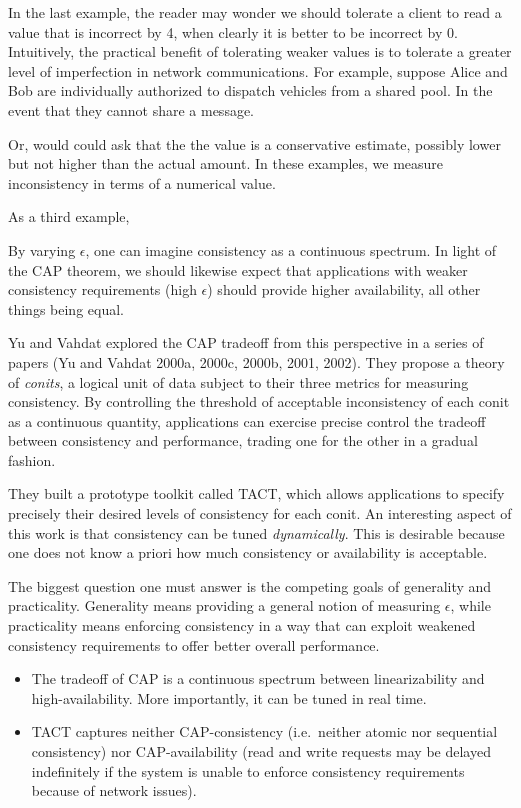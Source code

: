 \documentclass[]             %
{NASA}                       %
\theoremstyle{definition}
\begin{document}
In the last example, the reader may wonder we should tolerate a client
to read a value that is incorrect by 4, when clearly it is better to be
incorrect by 0. Intuitively, the practical benefit of tolerating weaker
values is to tolerate a greater level of imperfection in network
communications. For example, suppose Alice and Bob are individually
authorized to dispatch vehicles from a shared pool. In the event that
they cannot share a message.

Or, would could ask that the the value is a conservative estimate,
possibly lower but not higher than the actual amount. In these examples,
we measure inconsistency in terms of a numerical value.

As a third example,

By varying \(\epsilon\), one can imagine consistency as a continuous
spectrum. In light of the CAP theorem, we should likewise expect that
applications with weaker consistency requirements (high \(\epsilon\))
should provide higher availability, all other things being equal.

Yu and Vahdat explored the CAP tradeoff from this perspective in a
series of papers (Yu and Vahdat 2000a, 2000c, 2000b, 2001, 2002). They
propose a theory of \emph{conits}, a logical unit of data subject to
their three metrics for measuring consistency. By controlling the
threshold of acceptable inconsistency of each conit as a continuous
quantity, applications can exercise precise control the tradeoff between
consistency and performance, trading one for the other in a gradual
fashion.

They built a prototype toolkit called TACT, which allows applications to
specify precisely their desired levels of consistency for each conit. An
interesting aspect of this work is that consistency can be tuned
\emph{dynamically}. This is desirable because one does not know a priori
how much consistency or availability is acceptable.

The biggest question one must answer is the competing goals of
generality and practicality. Generality means providing a general notion
of measuring \(\epsilon\), while practicality means enforcing
consistency in a way that can exploit weakened consistency requirements
to offer better overall performance.

\begin{itemize}
\item
  The tradeoff of CAP is a continuous spectrum between linearizability
  and high-availability. More importantly, it can be tuned in real time.
\item
  TACT captures neither CAP-consistency (i.e.~neither atomic nor
  sequential consistency) nor CAP-availability (read and write requests
  may be delayed indefinitely if the system is unable to enforce
  consistency requirements because of network issues).
\end{itemize}
\end{document}
